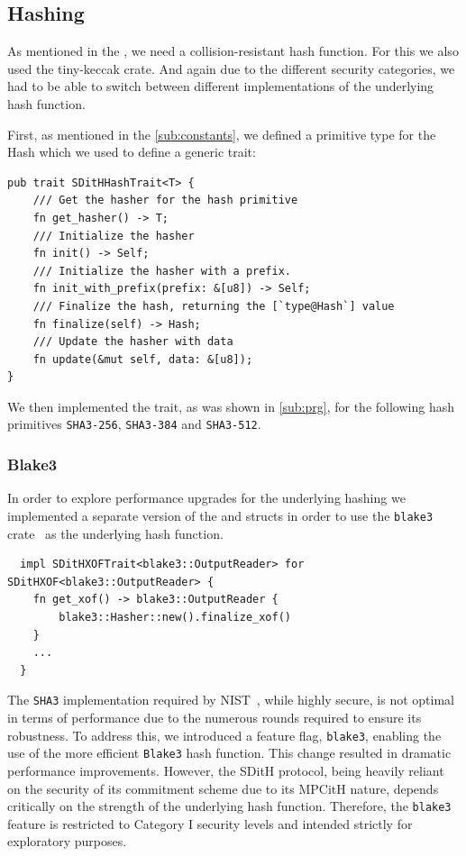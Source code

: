 \documentclass[11pt]{report}
\theoremstyle{definition}
\theoremstyle{plain}
\begin{document}
\subsection{Hashing}\label{sec:hashing} %
As mentioned in the , we need a collision-resistant hash function. For this we also used the tiny-keccak crate. And again due to the different security categories, we had to be able to switch between different implementations of the underlying hash function.

First, as mentioned in the \autoref{sub:constants}, we defined a primitive type for the Hash which we used to define a generic trait:

\begin{verbatim}
pub trait SDitHHashTrait<T> {
    /// Get the hasher for the hash primitive
    fn get_hasher() -> T;
    /// Initialize the hasher
    fn init() -> Self;
    /// Initialize the hasher with a prefix. 
    fn init_with_prefix(prefix: &[u8]) -> Self;
    /// Finalize the hash, returning the [`type@Hash`] value
    fn finalize(self) -> Hash;
    /// Update the hasher with data
    fn update(&mut self, data: &[u8]);
}
\end{verbatim}

We then implemented the trait, as was shown in \autoref{sub:prg}, for the following hash primitives \texttt{SHA3-256}, \texttt{SHA3-384} and \texttt{SHA3-512}.

\subsubsection*{Blake3}\label{sub:blake3}

In order to explore performance upgrades for the underlying hashing we implemented a separate version of the  and  structs in order to use the \texttt{blake3} crate~\cite{blakethree} as the underlying hash function.

\begin{verbatim}
  impl SDitHXOFTrait<blake3::OutputReader> for SDitHXOF<blake3::OutputReader> {
    fn get_xof() -> blake3::OutputReader {
        blake3::Hasher::new().finalize_xof()
    }
    ...
  }
\end{verbatim}

The \texttt{SHA3} implementation required by NIST~\cite{nistcall}, while highly secure, is not optimal in terms of performance due to the numerous rounds required to ensure its robustness. To address this, we introduced a feature flag, \texttt{blake3}, enabling the use of the more efficient \texttt{Blake3} hash function. This change resulted in dramatic performance improvements. However, the SDitH protocol, being heavily reliant on the security of its commitment scheme due to its MPCitH nature, depends critically on the strength of the underlying hash function. Therefore, the \texttt{blake3} feature is restricted to Category I security levels and intended strictly for exploratory purposes.
\end{document}
